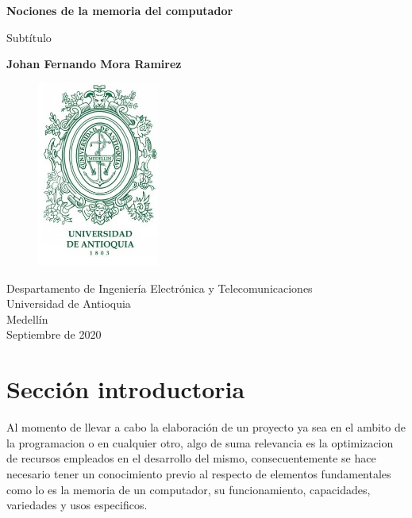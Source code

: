 \documentclass{article}
\begin{document}
\begin{titlepage}
    \begin{center}
        \vspace*{1cm}
            
        \Huge
        \textbf{Nociones de la memoria del computador}
            
        \vspace{0.5cm}
        \LARGE
        Subtítulo
            
        \vspace{1.5cm}
            
        \textbf{Johan Fernando Mora Ramirez}
        
         \vspace{1.5cm}
         \begin{figure}[h]
        \includegraphics[width=4cm]{EscudoUdea.jpg}
        \centering
       
        \label{fig:EscudoUdea}
        \end{figure}
            
        \vfill
            
        \vspace{0.8cm}
            
        \Large
        Despartamento de Ingeniería Electrónica y Telecomunicaciones\\
        Universidad de Antioquia\\
        Medellín\\
        Septiembre de 2020
            
    \end{center}
\end{titlepage}

\tableofcontents
\newpage
\section{Sección introductoria}\label{intro}
Al momento de llevar a cabo la elaboración de un proyecto ya sea en el ambito de la programacion o en cualquier otro, algo de suma relevancia es la optimizacion de recursos empleados en el desarrollo del mismo, consecuentemente se hace necesario tener un conocimiento previo al respecto de elementos fundamentales como lo es la memoria de un computador, su funcionamiento, capacidades, variedades y usos especificos.
\end{document}
